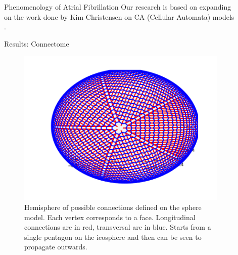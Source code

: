 \documentclass[final,hyperref={pdfpagelabels=false}]{beamer}
\begin{document}
\begin{frame}[t]
\begin{columns}[t]
\begin{column}{.465\textwidth}
\begin{block}{Phenomenology of Atrial Fibrillation}
 Our research is based on expanding on the work done by Kim Christensen on CA (Cellular Automata) models \cite{Christensen}.


\end{block}

\begin{block}{Results: Connectome}

\begin{figure}
\includegraphics[width=0.7\linewidth]{connectome}
\caption{Hemisphere of possible connections defined on the sphere model. Each vertex corresponds to a face. Longitudinal connections are in red, transversal are in blue. Starts from a single pentagon on the icosphere and then can be seen to propagate outwards. }
\end{figure}

\end{block}




\end{column} %

\begin{column}{.03\textwidth}\end{column} %
 
\begin{column}{.465\textwidth} %


\end{column}
\end{columns}
\end{frame}
\end{document}
